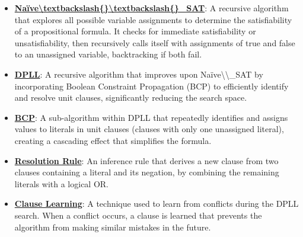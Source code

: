 \documentclass{article}%
\begin{document}
\begin{itemize}[leftmargin=*]%
\item \href{https://purdue.brightspace.com/d2l/common/assets/pdfjs-d2l-dist/1.0.14-legacy/web/viewer.html?file=\%2Fcontent\%2Fenforced\%2F1095467-wl.202510.CS.24300.001\%2F15L2-SAT.pdf\%3Fou\%3D1095467\&lang=en-us\&container=d2l-fileviewer-rendered-pdf\&fullscreen=d2l-fileviewer-rendered-pdf-dialog\&height=667#page=18}{\textbf{Naïve\textbackslash{}textbackslash\{\}\textbackslash{}textbackslash\{\}\_SAT}}: A recursive algorithm that explores all possible variable assignments to determine the satisfiability of a propositional formula. It checks for immediate satisfiability or unsatisfiability, then recursively calls itself with assignments of true and false to an unassigned variable, backtracking if both fail.%
\item \href{https://purdue.brightspace.com/d2l/common/assets/pdfjs-d2l-dist/1.0.14-legacy/web/viewer.html?file=\%2Fcontent\%2Fenforced\%2F1095467-wl.202510.CS.24300.001\%2F15L2-SAT.pdf\%3Fou\%3D1095467\&lang=en-us\&container=d2l-fileviewer-rendered-pdf\&fullscreen=d2l-fileviewer-rendered-pdf-dialog\&height=667#page=17}{\textbf{DPLL}}: A recursive algorithm that improves upon Naïve\textbackslash{}\textbackslash{}_SAT by incorporating Boolean Constraint Propagation (BCP) to efficiently identify and resolve unit clauses, significantly reducing the search space.%
\item \href{https://purdue.brightspace.com/d2l/common/assets/pdfjs-d2l-dist/1.0.14-legacy/web/viewer.html?file=\%2Fcontent\%2Fenforced\%2F1095467-wl.202510.CS.24300.001\%2F15L2-SAT.pdf\%3Fou\%3D1095467\&lang=en-us\&container=d2l-fileviewer-rendered-pdf\&fullscreen=d2l-fileviewer-rendered-pdf-dialog\&height=667#page=20}{\textbf{BCP}}: A sub-algorithm within DPLL that repeatedly identifies and assigns values to literals in unit clauses (clauses with only one unassigned literal), creating a cascading effect that simplifies the formula.%
\item \href{https://purdue.brightspace.com/d2l/common/assets/pdfjs-d2l-dist/1.0.14-legacy/web/viewer.html?file=\%2Fcontent\%2Fenforced\%2F1095467-wl.202510.CS.24300.001\%2F15L2-SAT.pdf\%3Fou\%3D1095467\&lang=en-us\&container=d2l-fileviewer-rendered-pdf\&fullscreen=d2l-fileviewer-rendered-pdf-dialog\&height=667#page=32}{\textbf{Resolution Rule}}: An inference rule that derives a new clause from two clauses containing a literal and its negation, by combining the remaining literals with a logical OR.%
\item \href{https://purdue.brightspace.com/d2l/common/assets/pdfjs-d2l-dist/1.0.14-legacy/web/viewer.html?file=\%2Fcontent\%2Fenforced\%2F1095467-wl.202510.CS.24300.001\%2F15L2-SAT.pdf\%3Fou\%3D1095467\&lang=en-us\&container=d2l-fileviewer-rendered-pdf\&fullscreen=d2l-fileviewer-rendered-pdf-dialog\&height=667#page=35}{\textbf{Clause Learning}}: A technique used to learn from conflicts during the DPLL search. When a conflict occurs, a clause is learned that prevents the algorithm from making similar mistakes in the future.%
\end{itemize}%
\end{document}
